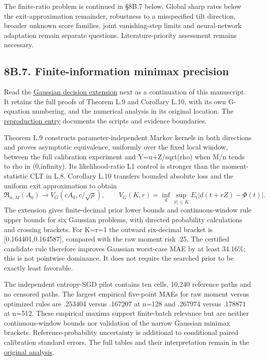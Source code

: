 The finite-ratio problem is continued in §8B.7 below. Global sharp rates
below the exit-approximation remainder, robustness to a misspecified
tilt direction, broader unknown score families, joint vanishing-step
limits and neural-network adaptation remain separate questions.
Literature-priority assessment remains necessary.

\subsection{8B.7. Finite-information minimax
precision}\label{local_prediction-b.7.-finite-information-minimax-precision}

Read the \href{gaussian_decision.md}{Gaussian decision extension} next
as a continuation of this manuscript. It retains the full proofs of
Theorem L.9 and Corollary L.10, with its own G-equation numbering, and
the numerical analysis in its original location. The
\href{../experiments/results/gaussian_decision/README.md}{reproduction
entry} documents the scripts and evidence boundaries.

Theorem L.9 constructs parameter-independent Markov kernels in both
directions and proves asymptotic equivalence, uniformly over the fixed
local window, between the full calibration experiment and
Y=u+Z/sqrt(rho) when M/n tends to rho in (0,infinity). Its
likelihood-ratio L1 control is stronger than the moment-statistic CLT in
L.8. Corollary L.10 transfers bounded absolute loss and the uniform exit
approximation to obtain \[
\mathfrak R_{n,M}(A_0)\longrightarrow
V_G(cA_0,c/\sqrt\rho),\qquad
V_G(K,r)=\inf_d\sup_{|t|\le K} E_t|d(t+rZ)-\Phi(t)|.
\] The extension gives finite-decimal prior lower bounds and
continuous-window rule upper bounds for six Gaussian problems, with
directed probability calculations and crossing brackets. For K=r=1 the
outward six-decimal bracket is {[}0.164401,0.164587{]}, compared with
the raw moment risk .25. The certified candidate rule therefore improves
Gaussian worst-case MAE by at least 34.16\%; this is not pointwise
dominance. It does not require the searched prior to be exactly least
favorable.

The independent entropy-SGD pilot contains ten cells, 10,240 reference
paths and no censored paths. The largest empirical five-point MAEs for
raw moment versus optimized rules are .253404 versus .167207 at n=128
and .267974 versus .178871 at n=512. These empirical maxima support
finite-batch relevance but are neither continuous-window bounds nor
validation of the narrow Gaussian minimax brackets.
Reference-probability uncertainty is additional to conditional paired
calibration standard errors. The full tables and their interpretation
remain in the
\href{../experiments/results/gaussian_decision/analysis.md\#7-results}{original
analysis}.

